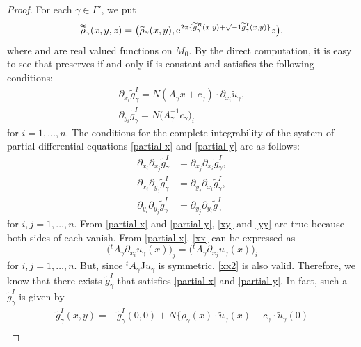 \documentclass[pdftex]{sigma}
\numberwithin{equation}{section}
\renewcommand{\tilde}{\widetilde}
\newcommand{\vardbtilde}[1]{\tilde{\raisebox{0pt}[0.85\height]{$\tilde{#1}$}}}
\def\J{\mathrm{J}}
\begin{document}
\begin{proof}
For each $\gamma\in \Gamma'$, we put
\[
{\vardbtilde \rho}_\gamma (x,y,z)=\bigl( {\tilde \rho}_\gamma (x,y),{\rm e}^{2\pi\{{\tilde g}^R_\gamma (x,y)+\sqrt{-1}{\tilde g}^I_\gamma(x,y)\}}z\bigr) ,
\]
where \smash{${\tilde g}^R_\gamma$} and \smash{${\tilde g}^I_\gamma$} are real valued functions on $M_0$. By the direct computation, it is easy to see
that \smash{${\vardbtilde \rho}_\gamma$} preserves  if and only if \smash{${\tilde g}^R_\gamma$} is constant and \smash{${\tilde g}^I_\gamma$} satisfies the following conditions:
\begin{gather}
\partial_{x_i}{\tilde g}^I_\gamma=N(A_\gamma x+c_\gamma)\cdot \partial_{x_i} {\tilde u}_\gamma,\label{partial x}\\
\partial_{y_i} {\tilde g}^I_\gamma=N\bigl(A_\gamma^{-1}c_\gamma\bigr)_i \label{partial y}
\end{gather}
for $i=1, \ldots , n$.
The conditions for the complete integrability of the system of partial differential equations \eqref{partial x} and \eqref{partial y} are as follows:
\begin{align}
\partial_{x_i}\partial_{x_j}{\tilde g}^I_\gamma&=\partial_{x_j}\partial_{x_i}{\tilde g}^I_\gamma , \label{xx}\\
\partial_{x_i}\partial_{y_j}{\tilde g}^I_\gamma&=\partial_{y_j}\partial_{x_i}{\tilde g}^I_\gamma , \label{xy}\\
\partial_{y_i}\partial_{y_j}{\tilde g}^I_\gamma&=\partial_{y_j}\partial_{y_i}{\tilde g}^I_\gamma \label{yy}
\end{align}
for $i, j=1, \ldots , n$. From \eqref{partial x} and \eqref{partial y}, \eqref{xy} and \eqref{yy} are true because both sides of each vanish. From \eqref{partial x}, \eqref{xx} can be expressed as
\begin{equation}\label{xx2}
\bigl( {}^tA_\gamma\partial_{x_i}u_\gamma (x)\bigr)_j=\bigl( {}^tA_\gamma\partial_{x_j}u_\gamma (x)\bigr)_i
\end{equation}
for $i, j=1, \ldots , n$. But, since ${}^tA_\gamma \J u_\gamma$ is symmetric, \eqref{xx2} is also valid. Therefore, we know that there exists ${\tilde g}^I_\gamma$ that satisfies \eqref{partial x} and \eqref{partial y}. In fact, such a ${\tilde g}^I_\gamma$ is given by
 \begin{align}
 {\tilde g}^I_\gamma (x,y)={}&{\tilde g}^I_\gamma (0,0)+N\biggl\{\rho_\gamma (x)\cdot {\tilde u}_\gamma(x)-c_\gamma \cdot {\tilde u}_\gamma(0) \nonumber\\

\end{align}
\end{proof}
\end{document}

